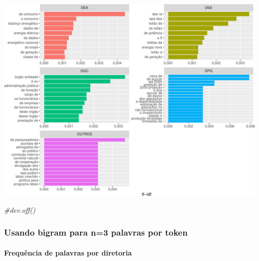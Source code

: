 \documentclass[]{article}
\newenvironment{Shaded}{\begin{snugshade}}{\end{snugshade}}
\newcommand{\CommentTok}[1]{\textcolor[rgb]{0.56,0.35,0.01}{\textit{#1}}}
\let\oldparagraph\paragraph
\renewcommand{\paragraph}[1]{\oldparagraph{#1}\mbox{}}
\begin{document}
\includegraphics{markdown_v31_files/figure-latex/03_freq_palavras_dir-1.pdf}

\begin{Shaded}
\begin{Highlighting}[]
\CommentTok{#dev.off()}
\end{Highlighting}
\end{Shaded}

\subsubsection{Usando bigram para n=3 palavras por
token}\label{usando-bigram-para-n3-palavras-por-token}

\paragraph{Frequência de palavras por
diretoria}\label{frequencia-de-palavras-por-diretoria-5}
\end{document}
